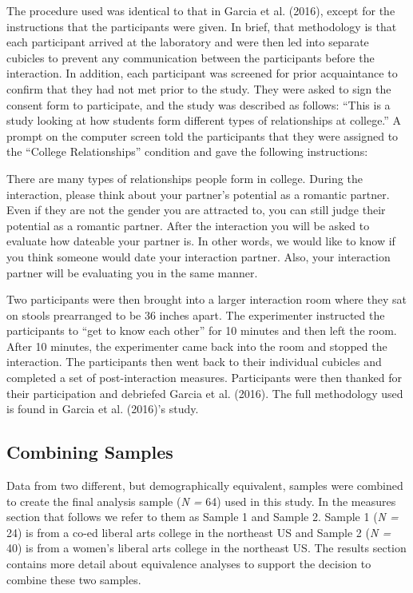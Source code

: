 \documentclass[man]{apa6}
\begin{document}
The procedure used was identical to that in Garcia et al. (2016), except
for the instructions that the participants were given. In brief, that
methodology is that each participant arrived at the laboratory and were
then led into separate cubicles to prevent any communication between the
participants before the interaction. In addition, each participant was
screened for prior acquaintance to confirm that they had not met prior
to the study. They were asked to sign the consent form to participate,
and the study was described as follows: \enquote{This is a study looking
at how students form different types of relationships at college.} A
prompt on the computer screen told the participants that they were
assigned to the \enquote{College Relationships} condition and gave the
following instructions:

There are many types of relationships people form in college. During the
interaction, please think about your partner's potential as a romantic
partner. Even if they are not the gender you are attracted to, you can
still judge their potential as a romantic partner. After the interaction
you will be asked to evaluate how dateable your partner is. In other
words, we would like to know if you think someone would date your
interaction partner. Also, your interaction partner will be evaluating
you in the same manner.

Two participants were then brought into a larger interaction room where
they sat on stools prearranged to be 36 inches apart. The experimenter
instructed the participants to \enquote{get to know each other} for 10
minutes and then left the room. After 10 minutes, the experimenter came
back into the room and stopped the interaction. The participants then
went back to their individual cubicles and completed a set of
post-interaction measures. Participants were then thanked for their
participation and debriefed Garcia et al. (2016). The full methodology
used is found in Garcia et al. (2016)'s study.

\subsection{Combining Samples}\label{combining-samples}

Data from two different, but demographically equivalent, samples were
combined to create the final analysis sample (\emph{N =} 64) used in
this study. In the measures section that follows we refer to them as
Sample 1 and Sample 2. Sample 1 (\emph{N =} 24) is from a co-ed liberal
arts college in the northeast US and Sample 2 (\emph{N =} 40) is from a
women's liberal arts college in the northeast US. The results section
contains more detail about equivalence analyses to support the decision
to combine these two samples.
\end{document}
